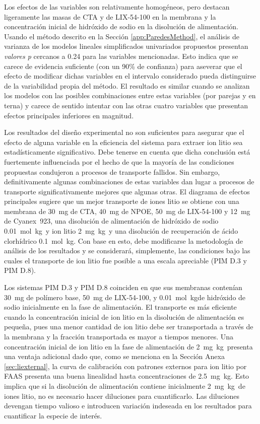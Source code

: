 Los efectos de las variables son relativamente homogéneos, pero destacan ligeramente las masas de CTA y de LIX-54-100 en la membrana y la concentración inicial de hidróxido de sodio en la disolución de alimentación. Usando el método descrito en la Sección \ref{app:ParedesMethod}, el análisis de varianza de los modelos lineales simplificados univariados propuestos presentan \textit{valores p}  cercanos a 0.24 para las variables mencionadas. Esto indica que se carece de evidencia suficiente (con un 90\% de confianza) para aseverar que el efecto de modificar dichas variables en el intervalo considerado pueda distinguirse de la variabilidad propia del método. El resultado es similar cuando se analizan los modelos con las posibles combinaciones entre estas variables (por parejas y en terna) y carece de sentido intentar con las otras cuatro variables que presentan efectos principales inferiores en magnitud. 

Los resultados del diseño experimental no son suficientes para asegurar que el efecto de alguna variable en la eficiencia del sistema para extraer ion litio sea estadísticamente significativo. Debe tener\-se en cuenta que dicha conclusión está fuertemente influenciada por el hecho de que la mayo\-ría de las condiciones propuestas condujeron a procesos de transporte fallidos. Sin embargo, definitivamente algunas combinaciones de estas variables dan lugar a procesos de transporte significativamente mejores que algunas otras. El diagrama de efectos principales sugiere que un mejor transporte de iones litio se obtiene con una membrana de 30~mg de CTA, 40~mg de NPOE, 50~mg de LIX-54-100 y 12~mg de Cyanex~923, una disolución de alimentación de hidróxido de sodio 0.01~mol~kg\mnn\ y ion litio 2~mg~kg\mnn\ y una disolución de recuperación de ácido clorhídrico 0.1~mol~kg\mnn. Con base en esto, debe modificarse la metodología de análisis de los resultados y se considerará, simplemente, las condiciones bajo las cuales el transporte de ion litio fue posible a una escala apreciable (PIM D.3 y PIM D.8). 

Los sistemas PIM D.3 y PIM D.8 coinciden en que sus membranas contenían 30~mg de polímero base, 50~mg de LIX-54-100, y 0.01~mol~kg\mnn de hidróxido de sodio inicialmente en la fase de alimentación. El transporte es más eficiente cuando la concentración inicial de ion litio en la disolución de alimentación es pequeña, pues una menor cantidad de ion litio debe ser transportada a través de la membrana y la fracción transportada es mayor a tiempos menores. Una concentración inicial de ion litio en la fase de alimentación de 2~mg~kg\mnn\ presenta una ventaja adicional dado que, como se menciona en la Sección Anexa \ref{sec:liexternal}, la curva de calibración con patrones externos para ion litio por \ac{FAAS} presenta una buena linealidad hasta concentraciones de 2.5~mg~kg\mnn. Esto implica que si la disolución de alimentación contiene inicialmente 2~mg~kg\mnn\ de iones litio, no es necesario hacer diluciones para cuantificarlo. Las diluciones devengan tiempo valioso e introducen variación indeseada en los resultados para cuantificar la especie de interés. 

